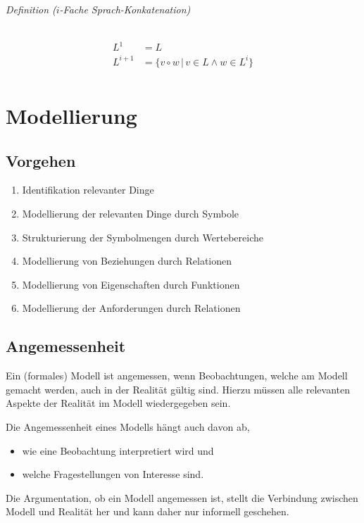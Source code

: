 \documentclass[a4paper, 11pt, accentcolor = tud3b]{tudreport}
\newcommand{\forwhich}{\ensuremath{{\,\vert\,}}}
\newcommand{\definition}[2]{\subparagraph{Definition (#1)} #2}
\begin{document}
				    \definition{$ i $-Fache Sprach-Konkatenation}{
					    \begin{align*}
						    L ^ 1 &= L \\
						    L ^ { i + 1 } &= \{ v \circ w \forwhich v \in L \land w \in L ^ i \} \\
					    \end{align*}
					}
    
    \chapter{Modellierung}
	    \section{Vorgehen}
		    \begin{enumerate}
		    	\item Identifikation relevanter Dinge
		    	\item Modellierung der relevanten Dinge durch Symbole
		    	\item Strukturierung der Symbolmengen durch Wertebereiche
		    	\item Modellierung von Beziehungen durch Relationen
		    	\item Modellierung von Eigenschaften durch Funktionen
		    	\item Modellierung der Anforderungen durch Relationen
		    \end{enumerate}
	    
	    \section{Angemessenheit}
		    Ein (formales) Modell ist angemessen, wenn Beobachtungen, welche am Modell gemacht werden, auch in der Realität gültig sind. Hierzu müssen alle relevanten Aspekte der Realität im Modell wiedergegeben sein.
		    
		    Die Angemessenheit eines Modells hängt auch davon ab,
		    \begin{itemize}
		    	\item wie eine Beobachtung interpretiert wird und
		    	\item welche Fragestellungen von Interesse sind.
		    \end{itemize}
		    
		    Die Argumentation, ob ein Modell angemessen ist, stellt die Verbindung zwischen Modell und Realität her und kann daher nur informell geschehen.
    
\end{document}
